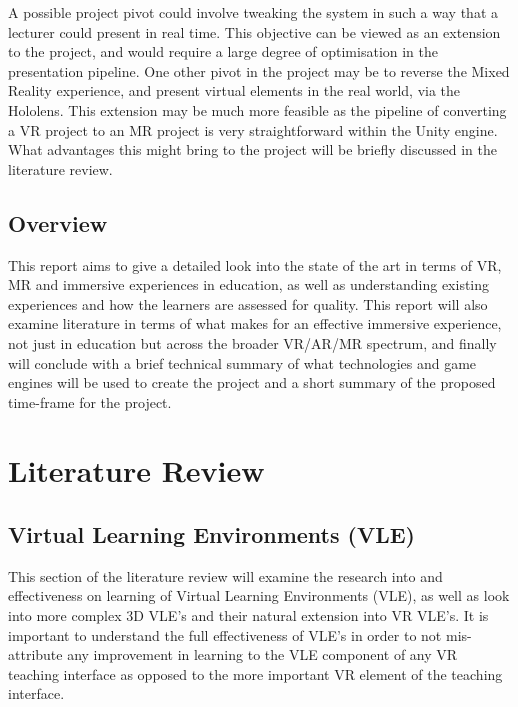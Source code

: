 \documentclass[11pt]{report}
\begin{document}
A possible project pivot could involve tweaking the system in such a way that a lecturer could present in real time. This objective can be viewed as an extension to the project, and would require a large degree of optimisation in the presentation pipeline. One other pivot in the project may be to reverse the Mixed Reality experience, and present virtual elements in the real world, via the Hololens. This extension may be much more feasible as the pipeline of converting a VR project to an MR project is very straightforward within the Unity engine. What advantages this might bring to the project will be briefly discussed in the literature review. 
\section{Overview}
This report aims to give a detailed look into the state of the art in terms of VR, MR and immersive experiences in education, as well as understanding existing experiences and how the learners are assessed for quality. This report will also examine literature in terms of what makes for an effective immersive experience, not just in education but across the broader VR/AR/MR spectrum, and finally will conclude with a brief technical summary of what technologies and game engines will be used to create the project and a short summary of the proposed time-frame for the project.
\chapter{Literature Review}
\section{Virtual Learning Environments (VLE)}
This section of the literature review will examine the research into and effectiveness on learning of Virtual Learning Environments (VLE), as well as look into more complex 3D VLE's and their natural extension into VR VLE's. It is important to understand the full effectiveness of VLE's in order to not mis-attribute any improvement in learning to the VLE component of any VR teaching interface as opposed to the more important VR element of the teaching interface. 
\end{document}
